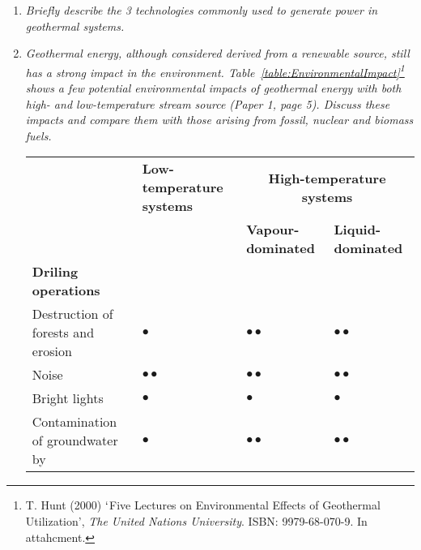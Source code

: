 \documentclass[12pts,a4paper,amsmath,amssymb,floatfix]{article}%
\begin{document}
\begin{enumerate}[label=\bfseries Problem \arabic*]
\begin{comment}
		=  71.65 * (80 - 60) * 4.1868 * 103    =   6.00 MW

hence saving in coal consumed per day =   6 x 10 6 *  86400  / (24 x 109) /0.8   =  27 tonnes
                                                                                          |                              |         =========
						  seconds in day	efficiency

[ alternatively since 6 MW of 22.22 MW is supplied,  saving is 6 / 22.22 * 100 = 27 tonnes again]

\end{comment}


\item\label{P2} {\it Briefly describe the 3 technologies commonly used to generate power in geothermal systems.}

\item {\it Geothermal energy, although considered derived from a renewable source, still has a strong impact in the environment. Table~\ref{table:EnvironmentalImpact}\footnote{T. Hunt (2000) $\lq$Five Lectures on Environmental Effects of Geothermal Utilization', {\it The United Nations University}. ISBN: 9979-68-070-9. In attahcment.} shows a few potential environmental impacts of geothermal energy with both high- and low-temperature stream source (Paper 1, page 5). Discuss these impacts and compare them with those arising from fossil, nuclear and biomass fuels.}
\begin{table}[h]
\begin{center}
  \begin{tabular}{l | l | l | l }
    \hline\hline
    \multirow{2}{*}{} & {\bf Low-temperature systems} & \multicolumn{2}{c}{\bf High-temperature systems} \\
                      &                               & {\bf Vapour-dominated}       & {\bf Liquid-dominated} \\
    \hline
    \multirow{1}{*}{\bf Driling operations} \\
    \hline
    Destruction of forests and erosion & $\bullet$            & $\bullet\bullet$             & $\bullet\bullet$  \\
    Noise                              & $\bullet\bullet$     & $\bullet\bullet$             & $\bullet\bullet$  \\
    Bright lights                      & $\bullet$            & $\bullet$                    & $\bullet$         \\
    Contamination of groundwater by    & $\bullet$            & $\bullet\bullet$             & $\bullet\bullet$  \\

\end{tabular}
\end{center}
\end{table}
\end{enumerate}
\end{document}
